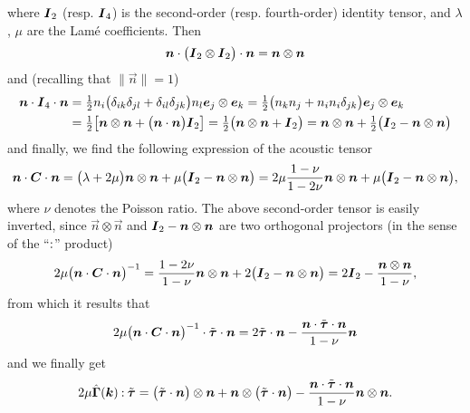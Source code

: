 where \(\boldsymbol I_2\) (resp. \(\boldsymbol I_4\)) is the second-order
(resp. fourth-order) identity tensor, and \(\lambda\), \(\mu\) are the Lamé
coefficients. Then
\begin{equation}
  \boldsymbol n\cdot\bigl(\boldsymbol I_2\otimes\boldsymbol I_2\bigr)\cdot\boldsymbol n=\boldsymbol n\otimes\boldsymbol n
\end{equation}
and (recalling that \(\lVert\vec n\rVert=1\))
\begin{equation}
  \begin{aligned}[b]
    \boldsymbol n\cdot\boldsymbol I_4\cdot\boldsymbol n
    &=\tfrac12 n_i\bigl(\delta_{ik}\delta_{jl}+\delta_{il}\delta_{jk}\bigr)n_l
    \boldsymbol e_j\otimes\boldsymbol e_k
    =\tfrac12\bigl(n_kn_j+n_in_i\delta_{jk}\bigr)\boldsymbol e_j\otimes\boldsymbol e_k\\
    &=\tfrac12\bigl[\boldsymbol n\otimes\boldsymbol n+\bigl(\boldsymbol n\cdot\boldsymbol n\bigr)\boldsymbol I_2\bigr]
    =\tfrac12\bigl(\boldsymbol n\otimes\boldsymbol n+\boldsymbol I_2\bigr)
    =\boldsymbol n\otimes\boldsymbol n+\tfrac12\bigl(\boldsymbol I_2-\boldsymbol n\otimes\boldsymbol n\bigr)
  \end{aligned}
\end{equation}
and finally, we find the following expression of the acoustic tensor
\begin{equation}
  \boldsymbol n\cdot\boldsymbol C\cdot\boldsymbol n
  =\bigl(\lambda+2\mu\bigr)\boldsymbol n\otimes\boldsymbol n
  +\mu\bigl(\boldsymbol I_2-\boldsymbol n\otimes\boldsymbol n\bigr)
  =2\mu\frac{1-\nu}{1-2\nu}\boldsymbol n\otimes\boldsymbol n
  +\mu\bigl(\boldsymbol I_2-\boldsymbol n\otimes\boldsymbol n\bigr),
\end{equation}
where \(\nu\) denotes the Poisson ratio. The above second-order tensor is easily
inverted, since \(\vec n\otimes\vec n\) and \(\boldsymbol I_2-\boldsymbol n\otimes\boldsymbol n\)
are two orthogonal projectors (in the sense of the ``\(\mathbin{\mathord{:}}\)'' product)
\begin{equation}
  2\mu\bigl(\boldsymbol n\cdot\boldsymbol C\cdot\boldsymbol n\bigr)^{-1}
  =\frac{1-2\nu}{1-\nu}\boldsymbol n\otimes\boldsymbol n
  +2\bigl(\boldsymbol I_2-\boldsymbol n\otimes\boldsymbol n\bigr)
  =2\boldsymbol I_2-\frac{\boldsymbol n\otimes\boldsymbol n}{1-\nu},
\end{equation}
from which it results that
\begin{equation}
  2\mu\bigl(\boldsymbol n\cdot\boldsymbol C\cdot\boldsymbol n\bigr)^{-1}
  \cdot\tilde{\boldsymbol\tau}\cdot\boldsymbol n
  =2\tilde{\boldsymbol\tau}\cdot\boldsymbol n
  -\frac{\boldsymbol n\cdot\tilde{\boldsymbol\tau}\cdot\boldsymbol n}{1-\nu}\boldsymbol n
\end{equation}
and we finally get
\begin{equation}
  \label{eq:20210927093916}
  2\mu\hat{\boldsymbol \Gamma}(\boldsymbol k)\mathbin{\mathord{:}}\tilde{\boldsymbol \tau}
  =\bigl(\tilde{\boldsymbol \tau}\cdot\boldsymbol n\bigr)\otimes\boldsymbol n
  +\boldsymbol n\otimes\bigl(\tilde{\boldsymbol \tau}\cdot\boldsymbol n\bigr)
  -\frac{\boldsymbol n\cdot\tilde{\boldsymbol \tau}\cdot\boldsymbol n}{1-\nu}\boldsymbol n\otimes\boldsymbol n.
\end{equation}


